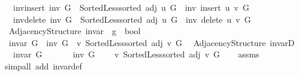 \begin{isabellebody}
\ \ \ inv{\isacharunderscore}{\kern0pt}insert{\isacharcolon}{\kern0pt}\ {\isachardoublequoteopen}inv\ G\ {\isasymand}\ Sorted{\isacharunderscore}{\kern0pt}Less{\isachardot}{\kern0pt}sorted\ {\isacharparenleft}{\kern0pt}adj\ u\ G{\isacharparenright}{\kern0pt}\ {\isasymLongrightarrow}\ inv\ {\isacharparenleft}{\kern0pt}insert\ u\ v\ G{\isacharparenright}{\kern0pt}{\isachardoublequoteclose}\isanewline
\ \ \ inv{\isacharunderscore}{\kern0pt}delete{\isacharcolon}{\kern0pt}\ {\isachardoublequoteopen}inv\ G\ {\isasymand}\ Sorted{\isacharunderscore}{\kern0pt}Less{\isachardot}{\kern0pt}sorted\ {\isacharparenleft}{\kern0pt}adj\ u\ G{\isacharparenright}{\kern0pt}\ {\isasymLongrightarrow}\ inv\ {\isacharparenleft}{\kern0pt}delete\ u\ v\ G{\isacharparenright}{\kern0pt}{\isachardoublequoteclose}\isanewline
%
\isadeliminvisible
\isanewline
%
\endisadeliminvisible
%
\isataginvisible
{}\isamarkupfalse%
\ {\isacharparenleft}{\kern0pt}\ Adjacency{\isacharunderscore}{\kern0pt}Structure{\isacharparenright}{\kern0pt}\ invar\ {\isacharcolon}{\kern0pt}{\isacharcolon}{\kern0pt}\ {\isachardoublequoteopen}{\isacharprime}{\kern0pt}g\ {\isasymRightarrow}\ bool{\isachardoublequoteclose}\ \isanewline
\ \ {\isachardoublequoteopen}invar\ G\ {\isasymequiv}\ inv\ G\ {\isasymand}\ {\isacharparenleft}{\kern0pt}{\isasymforall}v{\isachardot}{\kern0pt}\ Sorted{\isacharunderscore}{\kern0pt}Less{\isachardot}{\kern0pt}sorted\ {\isacharparenleft}{\kern0pt}adj\ v\ G{\isacharparenright}{\kern0pt}{\isacharparenright}{\kern0pt}{\isachardoublequoteclose}\isanewline
\isanewline
{}\isamarkupfalse%
\ {\isacharparenleft}{\kern0pt}\ Adjacency{\isacharunderscore}{\kern0pt}Structure{\isacharparenright}{\kern0pt}\ invarD{\isacharcolon}{\kern0pt}\isanewline
\ \ \ {\isachardoublequoteopen}invar\ G{\isachardoublequoteclose}\isanewline
\ \ \isanewline
\ \ \ \ {\isachardoublequoteopen}inv\ G{\isachardoublequoteclose}\isanewline
\ \ \ \ {\isachardoublequoteopen}{\isasymforall}v{\isachardot}{\kern0pt}\ Sorted{\isacharunderscore}{\kern0pt}Less{\isachardot}{\kern0pt}sorted\ {\isacharparenleft}{\kern0pt}adj\ v\ G{\isacharparenright}{\kern0pt}{\isachardoublequoteclose}%
\endisataginvisible
{\isafoldinvisible}%
%
\isadeliminvisible
\isanewline
%
\endisadeliminvisible
%
\isadelimproof
\ \ %
\endisadelimproof
%
\isatagproof
{}\isamarkupfalse%
\ assms\isanewline
\ \ \isamarkupfalse%
\ {\isacharparenleft}{\kern0pt}simp{\isacharunderscore}{\kern0pt}all\ add{\isacharcolon}{\kern0pt}\ invar{\isacharunderscore}{\kern0pt}def{\isacharparenright}{\kern0pt}%

\end{isabellebody}

